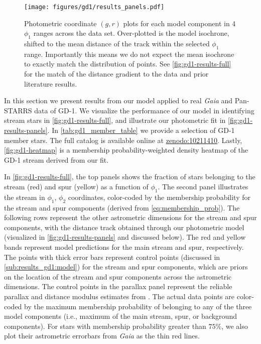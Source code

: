 \documentclass[twocolumn]{aastex631}
\newcommand{\stream}[1]{#1}
\newcommand{\dataarchive}[1]{\textit{#1}}
\newcommand{\Gaia}{\dataarchive{Gaia}}
\begin{document}
        \begin{figure*}[t]
            \centering
            \texttt{[image: figures/gd1/results\_panels.pdf]}
            \caption{%
                Photometric coordinate $(g, r)$ plots for each model component
                in 4 $\phi_1$ ranges across the data set. Over-plotted is the
                model isochrone, shifted to the mean distance of the track
                within the selected $\phi_1$ range. Importantly this means we do
                not expect the mean isochrone to exactly match the distribution
                of points. See \autoref{fig:gd1-results-full} for the match of
                the distance gradient to the data and prior literature results.
            }
            \label{fig:gd1-results-panels}
        \end{figure*}

        In this section we present results from our model applied to real {\it
        Gaia} and Pan-STARRS data of \stream{GD-1}.  We visualize the
        performance of our model in identifying stream stars in
        \autoref{fig:gd1-results-full}, and illustrate our photometric fit in
        \autoref{fig:gd1-results-panels}. In \autoref{tab:gd1_member_table} we
        provide a selection of \stream{GD-1} member stars. The full catalog is
        available online at
        \href{https://zenodo.org/records/10211410}{zenodo:10211410}. Lastly,
        \autoref{fig:gd1-heatmap} is a membership probability-weighted density
        heatmap of the \stream{GD-1} stream derived from our fit.

        In \autoref{fig:gd1-results-full}, the top panels shows the fraction of
        stars belonging to the stream (red) and spur (yellow) as a function of
        $\phi_1$. The second panel illustrates the stream in $\phi_1$, $\phi_2$
        coordinates, color-coded by the membership probability for the stream
        and spur components (derived from \autoref{eq:membership_prob}). The
        following rows represent the other astrometric dimensions for the stream
        and spur components, with the distance track obtained through our
        photometric model (visualized in \autoref{fig:gd1-results-panels} and
        discussed below). The red and yellow bands represent model predictions
        for the main stream and spur, respectively. The points with thick error
        bars represent control points (discussed in
        \autoref{sub:results_gd1:model}) for the stream and spur components,
        which are priors on the location of the stream and spur components
        across the astrometric dimensions. The control points in the parallax
        panel represent the reliable parallax and distance modulus estimates
        from \citet{deBoer+2020}. The actual data points are color-coded by the
        maximum membership probability of belonging to any of the three model
        components (i.e., maximum of the main stream, spur, or background
        components). For stars with membership probability greater than $75\%$,
        we also plot their astrometric errorbars from \Gaia{} as the thin red
        lines.
\end{document}
